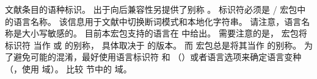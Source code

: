 \begin{fieldlist}



文献条目的语种标识。
出于向后兼容性另提供了别称 。
标识符必须是 / 宏包中的语言名称。
该信息用于文献中切换断词模式和本地化字符串。
请注意，语言名称是大小写敏感的。
目前本宏包支持的语言在 中给出。
需要注意的是， 宏包将标识符  当作  或  的别称，
具体取决于  的版本。
而 \biblatex 宏包总是将其当作  的别称。
为了避免可能的混淆，最好使用语言标识符  和 （）或者语言选项来确定语言变种
（，使用  域）。
比较  节中的  域。






\end{fieldlist}
